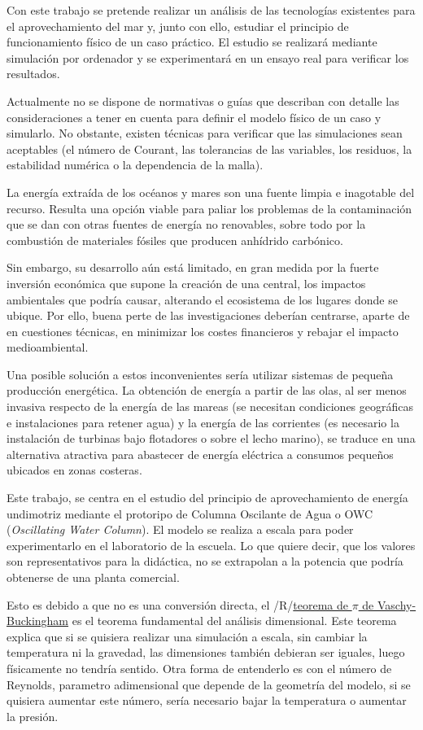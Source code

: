 Con este trabajo se pretende realizar un análisis de las tecnologías
existentes para el aprovechamiento del mar y, junto con ello, estudiar
el principio de funcionamiento físico de un caso práctico. El estudio se
realizará mediante simulación por ordenador y se experimentará en un
ensayo real para verificar los resultados.

Actualmente no se dispone de normativas o guías que describan con
detalle las consideraciones a tener en cuenta para definir el modelo
físico de un caso y simularlo. No obstante, existen técnicas para
verificar que las simulaciones sean aceptables (el número de Courant,
las tolerancias de las variables, los residuos, la estabilidad numérica
o la dependencia de la malla).

La energía extraída de los océanos y mares son una fuente limpia e
inagotable del recurso. Resulta una opción viable para paliar los
problemas de la contaminación que se dan con otras fuentes de energía no
renovables, sobre todo por la combustión de materiales fósiles que
producen anhídrido carbónico.

Sin embargo, su desarrollo aún está limitado, en gran medida por la
fuerte inversión económica que supone la creación de una central, los
impactos ambientales que podría causar, alterando el ecosistema de los
lugares donde se ubique. Por ello, buena perte de las investigaciones
deberían centrarse, aparte de en cuestiones técnicas, en minimizar los
costes financieros y rebajar el impacto medioambiental.

Una posible solución a estos inconvenientes sería utilizar sistemas de
pequeña producción energética. La obtención de energía a partir de las
olas, al ser menos invasiva respecto de la energía de las mareas (se
necesitan condiciones geográficas e instalaciones para retener agua) y
la energía de las corrientes (es necesario la instalación de turbinas
bajo flotadores o sobre el lecho marino), se traduce en una alternativa
atractiva para abastecer de energía eléctrica a consumos pequeños
ubicados en zonas costeras.

Este trabajo, se centra en el estudio del principio de aprovechamiento
de energía undimotriz mediante el protoripo de Columna Oscilante de Agua
o OWC (\emph{Oscillating Water Column}). El modelo se realiza a escala
para poder experimentarlo en el laboratorio de la escuela. Lo que quiere
decir, que los valores son representativos para la didáctica, no se
extrapolan a la potencia que podría obtenerse de una planta comercial.

Esto es debido a que no es una conversión directa, el
/R/\href{https://es.wikipedia.org/wiki/Teorema_\%CF\%80_de_Vaschy-Buckingham}{teorema
de \(\pi\) de Vaschy-Buckingham} es el teorema fundamental del análisis
dimensional. Este teorema explica que si se quisiera realizar una
simulación a escala, sin cambiar la temperatura ni la gravedad, las
dimensiones también debieran ser iguales, luego físicamente no tendría
sentido. Otra forma de entenderlo es con el número de Reynolds,
parametro adimensional que depende de la geometría del modelo, si se
quisiera aumentar este número, sería necesario bajar la temperatura o
aumentar la presión.

